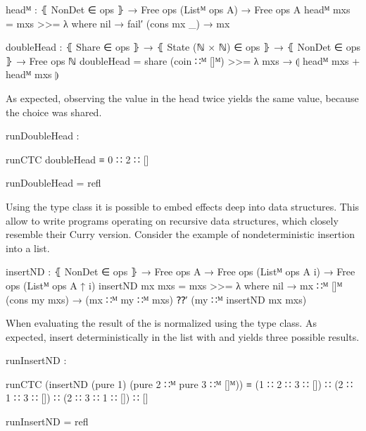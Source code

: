 \begin{code}
headᴹ : ⦃ NonDet ∈ ops ⦄ → Free ops (Listᴹ ops A) → Free ops A
headᴹ mxs = mxs >>= λ where
  nil         → fail′
  (cons mx _) → mx

doubleHead : ⦃ Share ∈ ops ⦄ → ⦃ State (ℕ × ℕ) ∈ ops ⦄ → ⦃ NonDet ∈ ops ⦄ →
  Free ops ℕ
doubleHead = share (coin ∷ᴹ []ᴹ) >>= λ mxs → ⦇ headᴹ mxs + headᴹ mxs ⦈
\end{code}
As expected, observing the value in the head twice yields the same value,
because the choice was shared.

\begin{center}
\begin{code}
runDoubleHead :
\end{code}
\begin{code}[inline]
 runCTC doubleHead ≡ 0 ∷ 2 ∷ []
\end{code}
\begin{code}
runDoubleHead = refl
\end{code}
\end{center}
Using the  type class it is possible to embed effects
deep into data structures.
This allow to write programs operating on recursive data structures, which
closely resemble their Curry version.
Consider the example of nondeterministic insertion into a list.

\begin{code}
insertND : ⦃ NonDet ∈ ops ⦄ →
  Free ops A → Free ops (Listᴹ ops A {i}) → Free ops (Listᴹ ops A {↑ i})
insertND mx mxs = mxs >>= λ where
  nil            → mx ∷ᴹ []ᴹ
  (cons my mxs)  → (mx ∷ᴹ my ∷ᴹ mxs) ⁇′ (my ∷ᴹ insertND mx mxs)
\end{code}
When evaluating the result of  the 
is normalized using the type class.
As expected, insert  deterministically in the list with
 and  yields three possible results.

\begin{center}
\begin{code}
runInsertND :
\end{code}
\begin{code}[inline]
 runCTC (insertND (pure 1) (pure 2 ∷ᴹ pure 3 ∷ᴹ []ᴹ)) ≡
   (1 ∷ 2 ∷ 3 ∷ []) ∷ (2 ∷ 1 ∷ 3 ∷ []) ∷ (2 ∷ 3 ∷ 1 ∷ []) ∷ []
\end{code}
\begin{code}
runInsertND = refl
\end{code}
\end{center}


